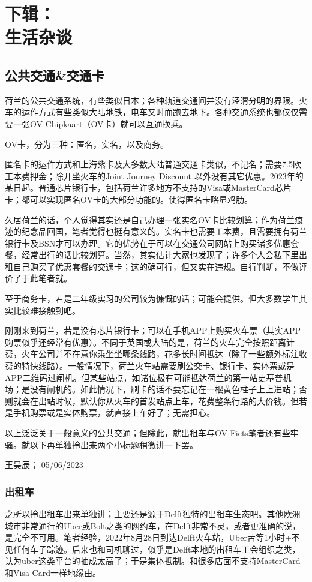 \chapter[下辑：生活杂谈]{下辑：\\生活杂谈}

\section{公共交通\&交通卡}
荷兰的公共交通系统，有些类似日本；各种轨道交通间并没有泾渭分明的界限。火车的运作方式有些类似大陆地铁，电车又时而跑去地下。各种交通系统也都仅仅需要一张OV Chipkaart（OV卡）就可以互通换乘。

OV卡，分为三种：匿名，实名，以及商务。

匿名卡的运作方式和上海紫卡及大多数大陆普通交通卡类似，不记名；需要7.5欧工本费押金；除开坐火车的Joint Journey Discount 以外没有其它优惠。2023年的某日起。普通芯片银行卡，包括荷兰许多地方不支持的Visa或MasterCard芯片卡；都可以实现匿名OV卡的大部分功能的。使得匿名卡略显鸡肋。

久居荷兰的话，个人觉得其实还是自己办理一张实名OV卡比较划算；作为荷兰痕迹的纪念品回国，笔者觉得也挺有意义的。实名卡也需要工本费，且需要拥有荷兰银行卡及BSN才可以办理。它的优势在于可以在交通公司网站上购买诸多优惠套餐，经常出行的话比较划算。当然，其实估计大家也发现了；许多个人会私下里出租自己购买了优惠套餐的交通卡；这的确可行，但又实在违规。自行判断，不做评价了于此笔者就。

至于商务卡，若是二年级实习的公司较为慷慨的话；可能会提供。但大多数学生其实比较难接触到吧。

刚刚来到荷兰，若是没有芯片银行卡；可以在手机APP上购买火车票（其实APP购票似乎还经常有优惠）。不同于英国或大陆的是，荷兰的火车完全按照距离计费，火车公司并不在意你乘坐坐哪条线路，花多长时间抵达（除了一些额外标注收费的特快线路）。一般情况下，荷兰火车站需要刷公交卡、银行卡、实体票或是APP二维码过闸机。但某些站点，如诸位极有可能抵达荷兰的第一站史基普机场；是没有闸机的。如此情况下，刷卡的话不要忘记在一根黄色柱子上上进站；否则就会在出站时候，默认你从火车的首发站点上车，花费整条行路的大价钱。但若是手机购票或是实体购票，就直接上车好了；无需担心。

以上泛泛关于一般意义的公共交通；但除此，就出租车与OV Fiets笔者还有些牢骚。就以下再单独拎出来两个小标题稍微讲一下罢。
\begin{flushright}
王昊辰； 05/06/2023
\end{flushright}

\subsection{出租车}
之所以拎出租车出来单独讲；主要还是源于Delft独特的出租车生态吧。其他欧洲城市非常通行的Uber或Bolt之类的网约车，在Delft非常不灵，或者更准确的说，是完全不可用。笔者经验，2022年8月28日到达Delft火车站，Uber苦等1小时+不见任何车子踪迹。后来也和司机聊过，似乎是Delft本地的出租车工会组织之类，认为uber这类平台的抽成太高了；于是集体抵制。和很多店面不支持MasterCard和Visa Card一样地缘由。

